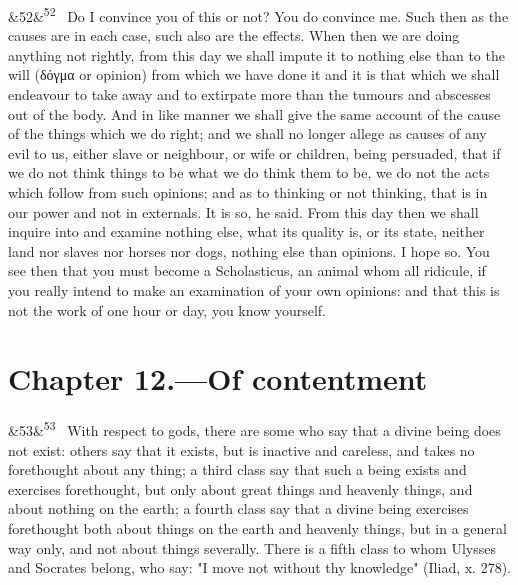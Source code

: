 \documentclass[12pt]{article}
\newcommand{\para}[1][]{\par\noindent\ifx&#1&\else\textsuperscript{\footnotesize #1}~\fi}
\begin{document}
\para[52] Do I convince you of this or not? You do convince me. Such then as the causes are in each case, such also are the effects. When then we are doing anything not rightly, from this day we shall impute it to nothing else than to the will (δόγμα or opinion) from which we have done it and it is that which we shall endeavour to take away and to extirpate more than the tumours and abscesses out of the body. And in like manner we shall give the same account of the cause of the things which we do right; and we shall no longer allege as causes of any evil to us, either slave or neighbour, or wife or children, being persuaded, that if we do not think things to be what we do think them to be, we do not the acts which follow from such opinions; and as to thinking or not thinking, that is in our power and not in externals. It is so, he said. From this day then we shall inquire into and examine nothing else, what its quality is, or its state, neither land nor slaves nor horses nor dogs, nothing else than opinions. I hope so. You see then that you must become a Scholasticus, an animal whom all ridicule, if you really intend to make an examination of your own opinions: and that this is not the work of one hour or day, you know yourself.

\section*{Chapter 12.---Of contentment}

\para[53] With respect to gods, there are some who say that a divine being does not exist: others say that it exists, but is inactive and careless, and takes no forethought about any thing; a third class say that such a being exists and exercises forethought, but only about great things and heavenly things, and about nothing on the earth; a fourth class say that a divine being exercises forethought both about things on the earth and heavenly things, but in a general way only, and not about things severally. There is a fifth class to whom Ulysses and Socrates belong, who say: "I move not without thy knowledge" (Iliad, x. 278).
\end{document}
